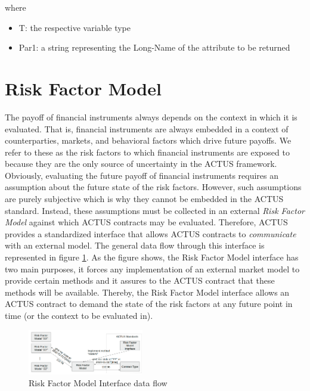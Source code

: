\documentclass[9pt,oneside]{amsart}
\begin{document}
\begin{multicols}{2}
where

\begin{itemize}
	\item T: the respective variable type

	\item Par1: a string representing the Long-Name of the attribute to be returned
\end{itemize}




\section{Risk Factor Model}\label{rfmodel}

The payoff of financial instruments always depends on the context in which it is evaluated. That is, financial instruments are always embedded in a context of counterparties, markets, and behavioral factors which drive future payoffs. We refer to these as the risk factors to which financial instruments are exposed to because they are the only source of uncertainty in the ACTUS framework. Obviously, evaluating the future payoff of financial instruments requires an assumption about the future state of the risk factors. However, such assumptions are purely subjective which is why they cannot be embedded in the ACTUS standard. Instead, these assumptions must be collected in an external \textit{Risk Factor Model}  against which ACTUS contracts may be evaluated.  Therefore, ACTUS provides a standardized interface that allows ACTUS contracts to \textit{communicate}  with an external model. The general data flow through this interface is represented in figure \ref{fig:rf-interface}. As the figure shows, the Risk Factor Model interface has two main purposes, it forces any implementation of an external market model to provide certain methods and it assures to the ACTUS contract that these methods will be available. Thereby, the Risk Factor Model interface allows an ACTUS contract to demand the state of the risk factors at any future point in time (or the context to be evaluated in).



\begin{figure}[H]
	\centering
	\includegraphics[width=0.45\textwidth]{./media/rf-interface.png}
	\caption{Risk Factor Model Interface data flow}
	\label{fig:rf-interface}
\end{figure}



\end{multicols}
\end{document}
